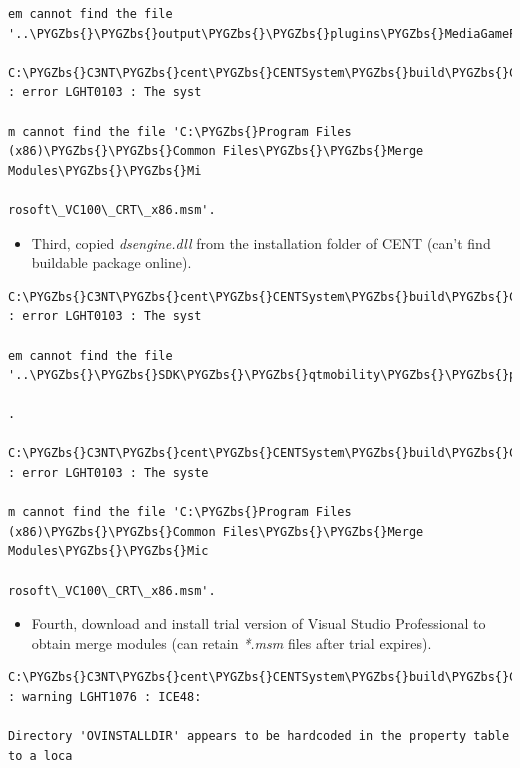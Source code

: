 \documentclass[letterpaper,10pt,english]{sphinxmanual}
\def\PYGZbs{\char`\\}
\begin{document}
\begin{enumerate}
\begin{description}
\begin{Verbatim}[commandchars=\\\{\}]
em cannot find the file '..\PYGZbs{}\PYGZbs{}output\PYGZbs{}\PYGZbs{}plugins\PYGZbs{}MediaGamePlugin.dll'.

C:\PYGZbs{}C3NT\PYGZbs{}cent\PYGZbs{}CENTSystem\PYGZbs{}build\PYGZbs{}CENTInstaller.wxs(54) : error LGHT0103 : The syst

m cannot find the file 'C:\PYGZbs{}Program Files (x86)\PYGZbs{}\PYGZbs{}Common Files\PYGZbs{}\PYGZbs{}Merge Modules\PYGZbs{}\PYGZbs{}Mi

rosoft\_VC100\_CRT\_x86.msm'.
\end{Verbatim}
\begin{itemize}
\item {} 
Third, copied \emph{dsengine.dll} from the installation folder of CENT (can't find buildable package online).

\end{itemize}

\begin{Verbatim}[commandchars=\\\{\}]
C:\PYGZbs{}C3NT\PYGZbs{}cent\PYGZbs{}CENTSystem\PYGZbs{}build\PYGZbs{}CENTInstaller.wxs(140) : error LGHT0103 : The syst

em cannot find the file '..\PYGZbs{}\PYGZbs{}SDK\PYGZbs{}\PYGZbs{}qtmobility\PYGZbs{}\PYGZbs{}plugins\PYGZbs{}mediaservice\PYGZbs{}dsengine.dll'

.

C:\PYGZbs{}C3NT\PYGZbs{}cent\PYGZbs{}CENTSystem\PYGZbs{}build\PYGZbs{}CENTInstaller.wxs(54) : error LGHT0103 : The syste

m cannot find the file 'C:\PYGZbs{}Program Files (x86)\PYGZbs{}\PYGZbs{}Common Files\PYGZbs{}\PYGZbs{}Merge Modules\PYGZbs{}\PYGZbs{}Mic

rosoft\_VC100\_CRT\_x86.msm'.
\end{Verbatim}
\begin{itemize}
\item {} 
Fourth, download and install trial version of Visual Studio Professional to obtain merge modules (can retain \emph{*.msm} files after trial expires).

\end{itemize}

\begin{Verbatim}[commandchars=\\\{\}]
C:\PYGZbs{}C3NT\PYGZbs{}cent\PYGZbs{}CENTSystem\PYGZbs{}build\PYGZbs{}CENTInstaller.wxs(59) : warning LGHT1076 : ICE48:

Directory 'OVINSTALLDIR' appears to be hardcoded in the property table to a loca


\end{Verbatim}
\end{description}
\end{enumerate}
\end{document}
